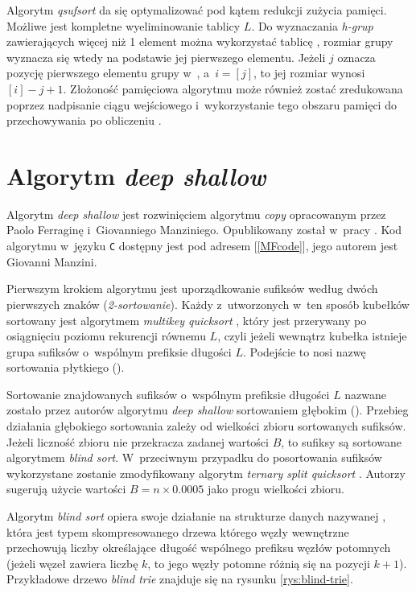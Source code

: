 Algorytm \emph{qsufsort} da się optymalizować pod kątem redukcji zużycia
pamięci. Możliwe jest kompletne wyeliminowanie tablicy $L$. Do wyznaczania \emph{h-grup} zawierających więcej niż 1 element można wykorzystać tablicę
\ISA{}, rozmiar grupy wyznacza się wtedy na podstawie jej pierwszego elementu.
Jeżeli $j$ oznacza pozycję pierwszego elementu grupy w~\SA{}, a~$i=$$[j]$, to jej rozmiar wynosi $[i] - j + 1$.
Złożoność pamięciowa algorytmu może również zostać zredukowana poprzez
nadpisanie ciągu wejściowego i~wykorzystanie tego obszaru pamięci do
przechowywania \ISA{} po obliczeniu .


\section{Algorytm \emph{deep shallow}}

Algorytm \emph{deep shallow} jest rozwinięciem algorytmu \emph{copy}
opracowanym przez Paolo Ferraginę i~Giovanniego Manziniego. Opublikowany został
w~pracy \cite{MF}. Kod algorytmu w~języku \texttt{C} dostępny jest pod adresem
[\ref{MFcode}], jego autorem jest Giovanni Manzini.

Pierwszym krokiem algorytmu jest uporządkowanie sufiksów według dwóch
pierwszych znaków (\emph{2-sortowanie}). Każdy z~utworzonych w~ten
sposób kubełków sortowany jest algorytmem \emph{multikey quicksort}
\cite{bentley}, który jest przerywany po osiągnięciu poziomu rekurencji równemu
$L$, czyli jeżeli wewnątrz kubełka istnieje grupa sufiksów o~wspólnym prefiksie
długości $L$. Podejście to nosi nazwę sortowania płytkiego ().

Sortowanie znajdowanych sufiksów o~wspólnym prefiksie długości $L$
nazwane zostało przez autorów algorytmu \emph{deep shallow} sortowaniem
głębokim (). Przebieg działania głębokiego sortowania zależy
od wielkości zbioru sortowanych sufiksów. Jeżeli liczność zbioru nie przekracza
zadanej wartości $B$, to sufiksy są sortowane algorytmem \emph{blind sort}. W~przeciwnym przypadku do posortowania sufiksów wykorzystane zostanie zmodyfikowany algorytm
\emph{ternary split quicksort} \cite{bentley-sort}. Autorzy sugerują użycie
wartości $B = n \times 0.0005$ jako progu wielkości zbioru.

Algorytm \emph{blind sort} opiera swoje działanie na strukturze danych
nazywanej  \cite{btree}, która jest typem skompresowanego
drzewa którego węzły wewnętrzne przechowują liczby określające długość wspólnego
prefiksu węzłów potomnych (jeżeli węzeł zawiera liczbę $k$, to jego węzły
potomne różnią się na pozycji $k+1$). Przykładowe drzewo \emph{blind trie}
znajduje się na rysunku \ref{rys:blind-trie}. 

